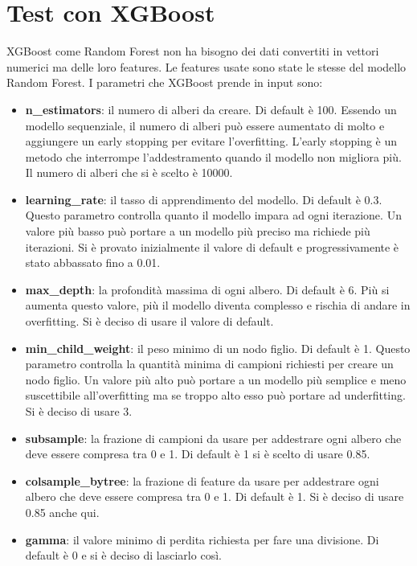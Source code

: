 \documentclass[12pt,a4paper,openright,twoside]{book}
\begin{document}
\section{Test con XGBoost}
XGBoost come Random Forest non ha bisogno dei dati convertiti in vettori numerici
ma delle loro features.
Le features usate sono state le stesse del modello Random Forest.
I parametri che XGBoost prende in input sono:
\begin{itemize}
    \item \textbf{n\_estimators}: il numero di alberi da creare.
    Di default è 100. Essendo un modello sequenziale, il numero di alberi
    può essere aumentato di molto e aggiungere un early stopping
    per evitare l'overfitting. L'early stopping è un metodo che interrompe
    l'addestramento quando il modello non migliora più. Il numero
    di alberi che si è scelto è 10000.
    \item \textbf{learning\_rate}: il tasso di apprendimento del modello.
    Di default è 0.3. Questo parametro controlla quanto il modello
    impara ad ogni iterazione. Un valore più basso può portare a un modello
    più preciso ma richiede più iterazioni.
    Si è provato inizialmente il valore di default e progressivamente
    è stato abbassato fino a 0.01.
    \item \textbf{max\_depth}: la profondità massima di ogni albero.
    Di default è 6. Più si aumenta questo valore, più il modello
    diventa complesso e rischia di andare in overfitting.
    Si è deciso di usare il valore di default.
    \item \textbf{min\_child\_weight}: il peso minimo di un nodo figlio.
    Di default è 1. Questo parametro controlla la quantità minima
    di campioni richiesti per creare un nodo figlio. Un valore più alto
    può portare a un modello più semplice e meno suscettibile all'overfitting
    ma se troppo alto esso può portare ad underfitting.
    Si è deciso di usare 3.
    \item \textbf{subsample}: la frazione di campioni da usare per addestrare
    ogni albero che deve essere compresa tra 0 e 1. Di default è 1
    si è scelto di usare 0.85.
    \item \textbf{colsample\_bytree}: la frazione di feature da usare per addestrare
    ogni albero che deve essere compresa tra 0 e 1. Di default è 1.
    Si è deciso di usare 0.85 anche qui.
    \item \textbf{gamma}: il valore minimo di perdita richiesta per fare una divisione.
    Di default è 0 e si è deciso di lasciarlo così.

\end{itemize}
\end{document}
